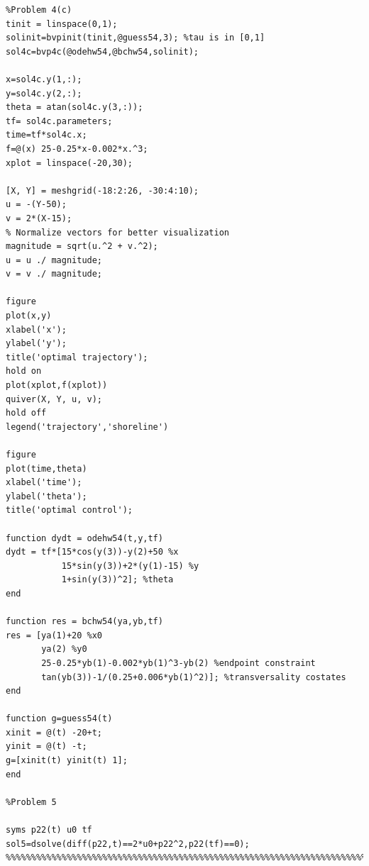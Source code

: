 \documentclass[12pt]{article}
\begin{document}
\begin{lstlisting}
%Problem 4(c)
tinit = linspace(0,1);
solinit=bvpinit(tinit,@guess54,3); %tau is in [0,1]
sol4c=bvp4c(@odehw54,@bchw54,solinit);

x=sol4c.y(1,:);
y=sol4c.y(2,:);
theta = atan(sol4c.y(3,:));
tf= sol4c.parameters;
time=tf*sol4c.x;
f=@(x) 25-0.25*x-0.002*x.^3; 
xplot = linspace(-20,30);

[X, Y] = meshgrid(-18:2:26, -30:4:10);
u = -(Y-50);
v = 2*(X-15);
% Normalize vectors for better visualization
magnitude = sqrt(u.^2 + v.^2);
u = u ./ magnitude;
v = v ./ magnitude;

figure
plot(x,y)
xlabel('x');
ylabel('y');
title('optimal trajectory');
hold on
plot(xplot,f(xplot))
quiver(X, Y, u, v);
hold off
legend('trajectory','shoreline')

figure
plot(time,theta)
xlabel('time');
ylabel('theta');
title('optimal control');

function dydt = odehw54(t,y,tf)
dydt = tf*[15*cos(y(3))-y(2)+50 %x
           15*sin(y(3))+2*(y(1)-15) %y
           1+sin(y(3))^2]; %theta
end

function res = bchw54(ya,yb,tf)
res = [ya(1)+20 %x0
       ya(2) %y0
       25-0.25*yb(1)-0.002*yb(1)^3-yb(2) %endpoint constraint
       tan(yb(3))-1/(0.25+0.006*yb(1)^2)]; %transversality costates
end

function g=guess54(t)
xinit = @(t) -20+t;
yinit = @(t) -t;
g=[xinit(t) yinit(t) 1];
end

%Problem 5

syms p22(t) u0 tf
sol5=dsolve(diff(p22,t)==2*u0+p22^2,p22(tf)==0);
%%%%%%%%%%%%%%%%%%%%%%%%%%%%%%%%%%%%%%%%%%%%%%%%%%%%%%%%%%%%%%%%%%%%%%%%%%
\end{lstlisting}
\end{document}
